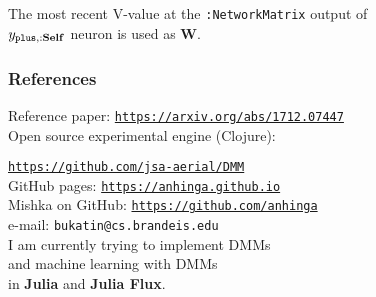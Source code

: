 \documentclass{beamer}
\newcommand{\msblue}[1]{{\color{myblue} #1}}
\begin{document}
\begin{frame}

The most recent V-value at the {\footnotesize\tt :NetworkMatrix} output of\\ $y_{{\tt plus}, {\bf :Self}}$ neuron is used as \msblue{\bf W}.


\end{frame}



\begin{frame}

  \frametitle{References}

Reference paper: \href{https://arxiv.org/abs/1712.07447}{\tt\footnotesize  https://arxiv.org/abs/1712.07447}\\[2ex]

Open source experimental engine (Clojure):

\href{https://github.com/jsa-aerial/DMM}{\tt\footnotesize https://github.com/jsa-aerial/DMM}\\[2ex]

GitHub pages: \href{https://anhinga.github.io}{\tt\footnotesize  https://anhinga.github.io}\\[2ex]

Mishka on GitHub: \href{https://github.com/anhinga}{\tt\footnotesize https://github.com/anhinga}\\[2ex]

e-mail: {\tt\footnotesize bukatin@cs.brandeis.edu}\\[2ex]

I am currently trying to implement DMMs\\
and machine learning with DMMs\\ in {\bf Julia} and {\bf Julia Flux}.


\end{frame}
\end{document}
